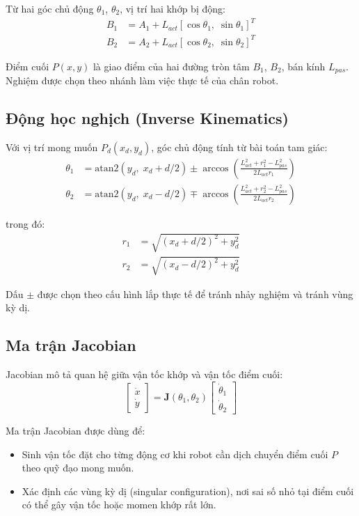 Từ hai góc chủ động $\theta_1$, $\theta_2$, vị trí hai khớp bị động:
\begin{align}
    B_1 &= A_1 + L_{act}[\cos\theta_1,\;\sin\theta_1]^T \\
    B_2 &= A_2 + L_{act}[\cos\theta_2,\;\sin\theta_2]^T
\end{align}

Điểm cuối $P(x,y)$ là giao điểm của hai đường tròn tâm $B_1$, $B_2$,
bán kính $L_{pas}$. Nghiệm được chọn theo nhánh làm việc thực tế của chân robot.

\subsection{Động học nghịch (Inverse Kinematics)}

Với vị trí mong muốn $P_d(x_d, y_d)$, góc chủ động tính từ bài toán tam giác:
\begin{align}
    \theta_1 &= \text{atan2}(y_d,\;x_d + d/2) \pm \arccos\!\left(\frac{L_{act}^2 + r_1^2 - L_{pas}^2}{2 L_{act} r_1}\right) \\
    \theta_2 &= \text{atan2}(y_d,\;x_d - d/2) \mp \arccos\!\left(\frac{L_{act}^2 + r_2^2 - L_{pas}^2}{2 L_{act} r_2}\right)
\end{align}

trong đó:
\begin{align*}
    r_1 &= \sqrt{(x_d + d/2)^2 + y_d^2} \\
    r_2 &= \sqrt{(x_d - d/2)^2 + y_d^2}
\end{align*}

Dấu $\pm$ được chọn theo cấu hình lắp thực tế để tránh nhảy nghiệm và
tránh vùng kỳ dị.

\subsection{Ma trận Jacobian}

Jacobian mô tả quan hệ giữa vận tốc khớp và vận tốc điểm cuối:
\begin{equation}
    \begin{bmatrix} \dot{x} \\ \dot{y} \end{bmatrix}
    = \mathbf{J}(\theta_1, \theta_2)
    \begin{bmatrix} \dot{\theta}_1 \\ \dot{\theta}_2 \end{bmatrix}
\end{equation}

Ma trận Jacobian được dùng để:
\begin{itemize}
    \item Sinh vận tốc đặt cho từng động cơ khi robot cần dịch chuyển điểm
    cuối $P$ theo quỹ đạo mong muốn.
    \item Xác định các vùng kỳ dị (singular configuration), nơi sai số nhỏ
    tại điểm cuối có thể gây vận tốc hoặc momen khớp rất lớn.
\end{itemize}


